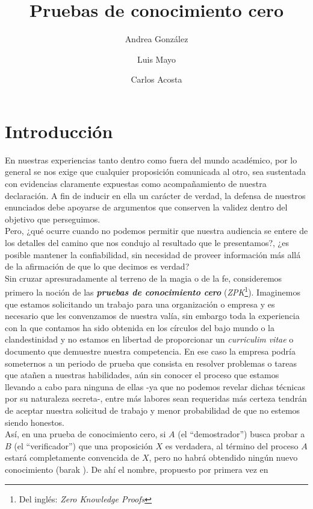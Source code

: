 \documentclass[oneside,10pt]{article}
\begin{document}
\author{Andrea González \and Luis Mayo \and Carlos Acosta}
\title{Pruebas de conocimiento cero}
\maketitle

\tableofcontents
\newpage 

\section{Introducción}
En nuestras experiencias tanto dentro como fuera del mundo académico,
por lo general se nos exige  que
cualquier proposición comunicada al otro, sea sustentada con evidencias
claramente expuestas como acompañamiento de nuestra declaración. A fin de
inducir en ella un carácter de verdad, la defensa de nuestros enunciados
debe apoyarse de argumentos que conserven la validez dentro del objetivo que
perseguimos. \\
Pero, ¿qué ocurre cuando
no podemos permitir que nuestra audiencia se entere de los detalles
del camino que nos condujo al resultado que le presentamos?, ¿es posible
mantener la confiabilidad, sin necesidad de proveer información más allá
de la afirmación de que lo que decimos es verdad?\\
Sin cruzar apresuradamente al terreno de la magia o de la fe, consideremos primero
la noción de las \textit{\textbf{pruebas de conocimiento cero}} (\textit{ZPK}\footnote{Del inglés: \textit{Zero Knowledge Proofs}}).
Imaginemos que estamos solicitando un trabajo para una organización o empresa y es
necesario que les convenzamos de nuestra valía, sin embargo toda la experiencia con
la que contamos ha sido obtenida en los círculos del bajo mundo o la clandestinidad y no
estamos en libertad de proporcionar un \textit{curriculim vitae} o documento que demuestre nuestra
competencia. En ese caso la empresa podría someternos a un periodo de prueba que consista en
resolver problemas o tareas que atañen a nuestras habilidades, aún sin conocer el proceso
que estamos llevando a cabo para ninguna de ellas -ya que no podemos revelar dichas técnicas por su
naturaleza secreta-, entre más labores sean requeridas
más certeza tendrán de aceptar nuestra solicitud de trabajo y menor probabilidad de que no estemos
siendo honestos.\\
Así, en una prueba de conocimiento cero, si $A$ (el ``demostrador'') busca probar a $B$ (el ``verificador'') que una proposición $X$ es verdadera, al término del proceso $A$ estará completamente convencida de $X$, pero no habrá obtendido ningún nuevo conocimiento (barak \cite{}). De ahí el nombre, propuesto por primera vez en
\end{document}
